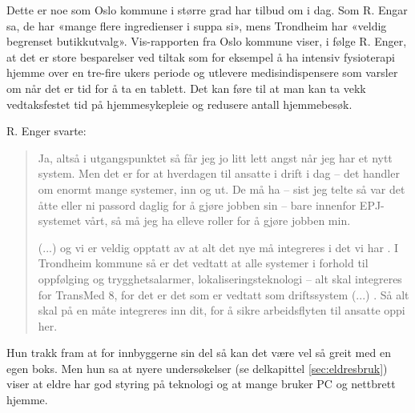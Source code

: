 Dette er noe som Oslo kommune i større grad har tilbud om i dag. Som R. Engar sa, de har «mange flere ingredienser i suppa si», mens Trondheim
har «veldig begrenset butikkutvalg». Vis-rapporten fra Oslo kommune viser, i følge R. Enger, at det er store besparelser ved tiltak som
for eksempel å ha intensiv fysioterapi hjemme over en tre-fire ukers periode og utlevere  medisindispensere som varsler om når det er tid for
å ta en tablett. Det kan føre til at man kan ta vekk vedtaksfestet tid på hjemmesykepleie og redusere antall hjemmebesøk.

\textit{}

R. Enger svarte:
\blockquote{Ja, altså i utgangspunktet så får jeg jo litt lett angst når jeg har et nytt system. Men det er
    for at hverdagen til ansatte i drift i dag -- det handler om
    enormt mange systemer, inn og ut. De må ha -- sist jeg telte så var det åtte eller ni passord daglig for å gjøre
    jobben sin -- bare innenfor EPJ-systemet vårt, så må
    jeg ha elleve roller for å gjøre jobben min.

(...) og vi er veldig opptatt av at alt det nye må integreres i det vi har . I Trondheim kommune så er det
vedtatt at alle systemer i forhold til oppfølging og
trygghetsalarmer, lokaliseringsteknologi -- alt skal integreres for TransMed 8, for det er det som er vedtatt som driftssystem (...)
. Så alt skal på en måte integreres inn dit, for å sikre arbeidsflyten til ansatte oppi her.}
Hun trakk fram at for innbyggerne sin del så kan det være vel så greit med en egen boks. Men hun sa at nyere
undersøkelser (se delkapittel \ref{sec:eldresbruk}) viser at eldre har god styring på teknologi og at mange bruker
PC og nettbrett hjemme.
